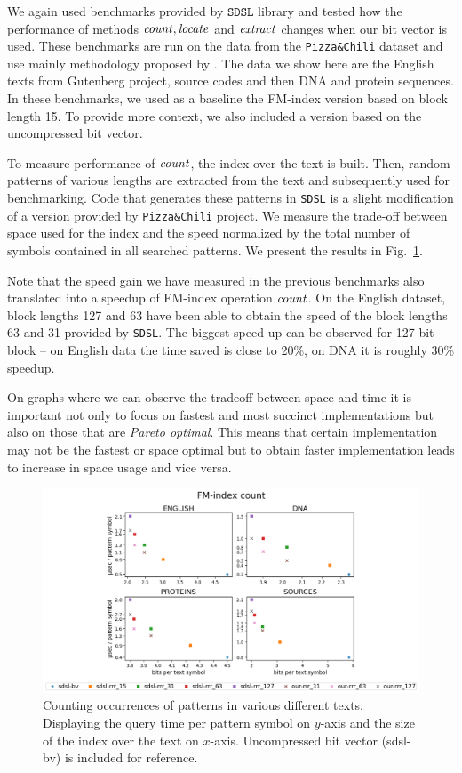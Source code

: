 We again used benchmarks provided by $\texttt{SDSL}$ library and tested how the performance
of methods $\mathit{count}, \mathit{locate}$ and $\mathit{extract}$ changes when our bit vector is used. These
benchmarks are run on the data from the \texttt{Pizza\&Chili} dataset and use mainly methodology
proposed by \cite{ferragina2009compressed}. The data we show here are the English texts from
Gutenberg project, source codes and then DNA and protein sequences. In these benchmarks, we used
as a baseline the FM-index version based on block length 15. To provide more context, we also included
a version based on the uncompressed bit vector.

To measure performance of $\mathit{count}$, the index over the text is built. Then, random patterns of
various lengths are extracted from the text and subsequently used for benchmarking. Code
that generates these patterns in \texttt{SDSL} is a slight modification of a version provided
by \texttt{Pizza\&Chili} project. We measure the trade-off between space used for the index and the
speed normalized by the total number of symbols contained in all searched patterns. We present the
results in Fig.~\ref{obr:benchmark_sdsl_count}.

Note that the speed gain we have measured in the previous benchmarks also translated
into a speedup of FM-index operation $\mathit{count}$. On the English dataset, block lengths 127 and 63 have
been able to obtain the speed of the block lengths 63 and 31 provided by \texttt{SDSL}. The biggest
speed up can be observed for 127-bit block -- on English data the time saved is close to 20\%, on
DNA it is roughly 30\% speedup.

On graphs where we can observe the tradeoff between space and time it is important not only to
focus on fastest and most succinct implementations but also on those that are \textit{Pareto optimal}.
This means that certain implementation may not be the fastest or space optimal but to obtain faster
implementation leads to increase in space usage and vice versa.

\begin{figure}
	\centerline{
		\includegraphics[width=\textwidth, height=0.4\textheight]{images/vysledky_sdsl_count}
	}
	\caption[TODO]{Counting occurrences of patterns in various different texts. Displaying
	the query time per pattern symbol on $y$-axis and the size of the index over the
	text on $x$-axis. Uncompressed bit vector (sdsl-bv) is included for reference. 
	}
	\label{obr:benchmark_sdsl_count}
\end{figure}

